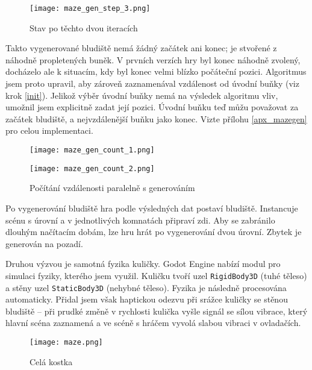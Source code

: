 \begin{figure}[H]
  \centering
  \texttt{[image: maze\_gen\_step\_3.png]}
  \caption{Stav po těchto dvou iteracích}
\end{figure}

Takto vygenerované bludiště nemá žádný začátek ani konec; je stvořené z náhodně propletených buněk. V prvních verzích hry byl konec náhodně zvolený, docházelo ale k situacím, kdy byl konec velmi blízko počáteční pozici. Algoritmus jsem proto upravil, aby zároveň zaznamenával vzdálenost od úvodní buňky (viz krok \ref{init}). Jelikož výběr úvodní buňky nemá na výsledek algoritmu vliv, umožnil jsem explicitně zadat její pozici. Úvodní buňku teď můžu považovat za začátek bludiště, a nejvzdálenější buňku jako konec. Vizte přílohu \ref{apx_mazegen} pro celou implementaci.

\begin{figure}[H]
  \centering

  \begin{minipage}{.5\textwidth}
    \centering
    \texttt{[image: maze\_gen\_count\_1.png]}
  \end{minipage}%
  \begin{minipage}{.5\textwidth}
    \centering
    \texttt{[image: maze\_gen\_count\_2.png]}
  \end{minipage}

  \caption{Počítání vzdálenosti paralelně s generováním}
\end{figure}

Po vygenerování bludiště hra podle výsledných dat postaví bludiště. Instancuje scénu s úrovní a v jednotlivých komnatách připraví zdi. Aby se zabránilo dlouhým načítacím dobám, lze hru hrát po vygenerování dvou úrovní. Zbytek je generován na pozadí.

Druhou výzvou je samotná fyzika kuličky. Godot Engine nabízí modul pro simulaci fyziky, kterého jsem využil. Kuličku tvoří uzel \texttt{RigidBody3D} (tuhé těleso) a stěny uzel \texttt{StaticBody3D} (nehybné těleso). Fyzika je následně procesována automaticky. Přidal jsem však haptickou odezvu při srážce kuličky se stěnou bludiště -- při prudké změně v rychlosti kulička vyšle signál se sílou vibrace, který hlavní scéna zaznamená a ve scéně s hráčem vyvolá slabou vibraci v ovladačích.

\begin{figure}[H]
  \centering
  \texttt{[image: maze.png]}
  \caption{Celá kostka}
  \label{maze_fig}
\end{figure}

